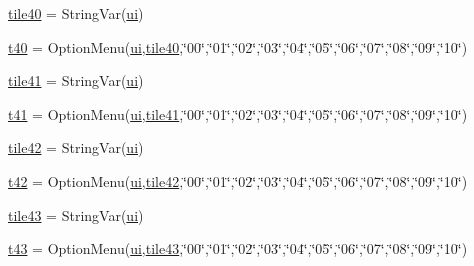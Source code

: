 \begin{DoxyCompactItemize}
\item 
\mbox{\hyperlink{namespacegui_abecd47cdd67a62874fe67c1538ecaddd}{tile40}} = String\+Var(\mbox{\hyperlink{namespacegui_a40ab7281456eadbea2dc2038f5c24fa1}{ui}})
\item 
\mbox{\hyperlink{namespacegui_afca94295ff8d04495ee9d6d60db58ecb}{t40}} = Option\+Menu(\mbox{\hyperlink{namespacegui_a40ab7281456eadbea2dc2038f5c24fa1}{ui}},\mbox{\hyperlink{namespacegui_abecd47cdd67a62874fe67c1538ecaddd}{tile40}},\char`\"{}00\char`\"{},\char`\"{}01\char`\"{},\char`\"{}02\char`\"{},\char`\"{}03\char`\"{},\char`\"{}04\char`\"{},\char`\"{}05\char`\"{},\char`\"{}06\char`\"{},\char`\"{}07\char`\"{},\char`\"{}08\char`\"{},\char`\"{}09\char`\"{},\char`\"{}10\char`\"{})
\item 
\mbox{\hyperlink{namespacegui_a70488256d9402586c324ab9d2aa29c16}{tile41}} = String\+Var(\mbox{\hyperlink{namespacegui_a40ab7281456eadbea2dc2038f5c24fa1}{ui}})
\item 
\mbox{\hyperlink{namespacegui_a20ba5872d7ff4f5062a4ba3576a9b7b5}{t41}} = Option\+Menu(\mbox{\hyperlink{namespacegui_a40ab7281456eadbea2dc2038f5c24fa1}{ui}},\mbox{\hyperlink{namespacegui_a70488256d9402586c324ab9d2aa29c16}{tile41}},\char`\"{}00\char`\"{},\char`\"{}01\char`\"{},\char`\"{}02\char`\"{},\char`\"{}03\char`\"{},\char`\"{}04\char`\"{},\char`\"{}05\char`\"{},\char`\"{}06\char`\"{},\char`\"{}07\char`\"{},\char`\"{}08\char`\"{},\char`\"{}09\char`\"{},\char`\"{}10\char`\"{})
\item 
\mbox{\hyperlink{namespacegui_acaf018b80c58203097d99ae83972c532}{tile42}} = String\+Var(\mbox{\hyperlink{namespacegui_a40ab7281456eadbea2dc2038f5c24fa1}{ui}})
\item 
\mbox{\hyperlink{namespacegui_af44e4929fe16fa32eb2c9faded7249a2}{t42}} = Option\+Menu(\mbox{\hyperlink{namespacegui_a40ab7281456eadbea2dc2038f5c24fa1}{ui}},\mbox{\hyperlink{namespacegui_acaf018b80c58203097d99ae83972c532}{tile42}},\char`\"{}00\char`\"{},\char`\"{}01\char`\"{},\char`\"{}02\char`\"{},\char`\"{}03\char`\"{},\char`\"{}04\char`\"{},\char`\"{}05\char`\"{},\char`\"{}06\char`\"{},\char`\"{}07\char`\"{},\char`\"{}08\char`\"{},\char`\"{}09\char`\"{},\char`\"{}10\char`\"{})
\item 
\mbox{\hyperlink{namespacegui_a4b23364a860cd384c4f910c6144a213e}{tile43}} = String\+Var(\mbox{\hyperlink{namespacegui_a40ab7281456eadbea2dc2038f5c24fa1}{ui}})
\item 
\mbox{\hyperlink{namespacegui_aaed30a2dbf1830a35fe7856139490b45}{t43}} = Option\+Menu(\mbox{\hyperlink{namespacegui_a40ab7281456eadbea2dc2038f5c24fa1}{ui}},\mbox{\hyperlink{namespacegui_a4b23364a860cd384c4f910c6144a213e}{tile43}},\char`\"{}00\char`\"{},\char`\"{}01\char`\"{},\char`\"{}02\char`\"{},\char`\"{}03\char`\"{},\char`\"{}04\char`\"{},\char`\"{}05\char`\"{},\char`\"{}06\char`\"{},\char`\"{}07\char`\"{},\char`\"{}08\char`\"{},\char`\"{}09\char`\"{},\char`\"{}10\char`\"{})

\end{DoxyCompactItemize}
